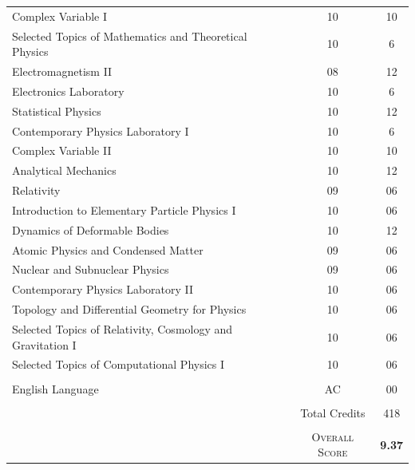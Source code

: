 \documentclass[a4paper,10pt]{article} %
\begin{document}
\begin{center}
\begin{tabular}{lcc}
Complex Variable I & 10 & 10\\
Selected Topics of Mathematics and Theoretical Physics & 10 & 6\\
Electromagnetism II & 08 & 12\\
Electronics Laboratory & 10 & 6\\
Statistical Physics & 10 &12\\
Contemporary Physics Laboratory I & 10 & 6\\
Complex Variable II & 10 & 10\\
Analytical Mechanics & 10 & 12\\
Relativity & 09 & 06\\
Introduction to Elementary Particle Physics I & 10 & 06\\
Dynamics of Deformable Bodies & 10 & 12\\
Atomic Physics and Condensed Matter & 09 & 06\\
Nuclear and Subnuclear Physics & 09 & 06\\
Contemporary Physics Laboratory II & 10 & 06\\
Topology and Differential Geometry for Physics & 10 & 06\\
Selected Topics of Relativity, Cosmology and Gravitation I & 10 & 06\\
Selected Topics of Computational Physics I& 10 & 06\\ \\
English Language & AC &	00\\ \\
& Total Credits & 418\\ \\
&\textsc{Overall Score}&\textbf{9.37}
\end{tabular}
\end{center}
\vspace{5cm}
\end{document}
